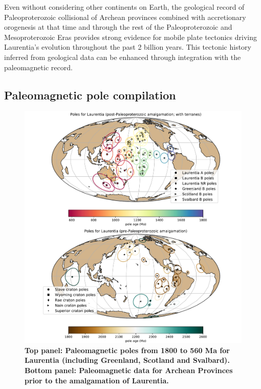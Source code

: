 \documentclass[11pt,letterpaper]{article}
\begin{document}
Even without considering other continents on Earth, the geological record of Paleoproterozoic collisional of Archean provinces combined with accretionary orogenesis at that time and through the rest of the Paleoproterozoic and Mesoproterozoic Eras provides strong evidence for mobile plate tectonics driving Laurentia's evolution throughout the past 2 billion years. This tectonic history inferred from geological data can be enhanced through integration with the paleomagnetic record.

\subsection{Paleomagnetic pole compilation}

\begin{figure}
\centering
\includegraphics[width=\textwidth]{../Figures/Laurentia_poles_combined.pdf}
\caption{\small{\textbf{Top panel: Paleomagnetic poles from 1800 to 560 Ma for Laurentia (including Greenland, Scotland and Svalbard). Bottom panel: Paleomagnetic data for Archean Provinces prior to the amalgamation of Laurentia.}}}
\label{fig:Laurentia_poles}
\end{figure}
\end{document}
